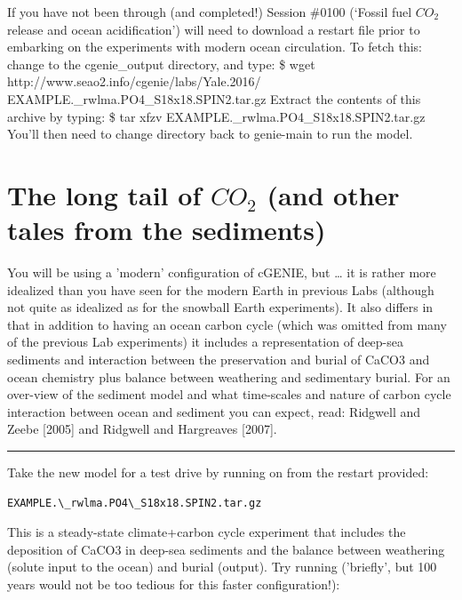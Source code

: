 \documentclass[11pt,fleqn]{book} %
\begin{document}
If you have not been through (and completed!) Session \#0100 (‘Fossil fuel \(CO_{2}\) release and ocean acidification’) will need to download a restart file prior to embarking on the experiments with modern ocean circulation.
To fetch this: change to the cgenie\_output directory, and type:
\$ wget http://www.seao2.info/cgenie/labs/Yale.2016/
 EXAMPLE.\_rwlma.PO4\_S18x18.SPIN2.tar.gz
Extract the contents of this archive by typing:
\$ tar xfzv EXAMPLE.\_rwlma.PO4\_S18x18.SPIN2.tar.gz 
You’ll then need to change directory back to genie-main to run the model.


\newpage


\section{The long tail of \(CO_{2}\) (and other tales from the sediments)}

You will be using a 'modern' configuration of cGENIE, but … it is rather more idealized than you have seen for the modern Earth in previous Labs (although not quite as idealized as for the snowball Earth experiments). It also differs in that in addition to having an ocean carbon cycle (which was omitted from many of the previous Lab experiments) it includes a representation of deep-sea sediments and interaction between the preservation and burial of CaCO3 and ocean chemistry plus balance between weathering and sedimentary burial. For an over-view of the sediment model and what time-scales and nature of carbon cycle interaction between ocean and sediment you can expect, read: Ridgwell and Zeebe [2005] and Ridgwell and Hargreaves [2007].

\vspace{1mm}
\noindent\rule{4cm}{0.1mm}
\vspace{2mm}

Take the new model for a test drive by running on from the restart provided:
\begin{verbatim}
EXAMPLE.\_rwlma.PO4\_S18x18.SPIN2.tar.gz
\end{verbatim}
This is a steady-state climate+carbon cycle experiment that includes the deposition of CaCO3 in deep-sea sediments and the balance between weathering (solute input to the ocean) and burial (output). Try running ('briefly', but 100 years would not be too tedious for this faster configuration!):
\end{document}
